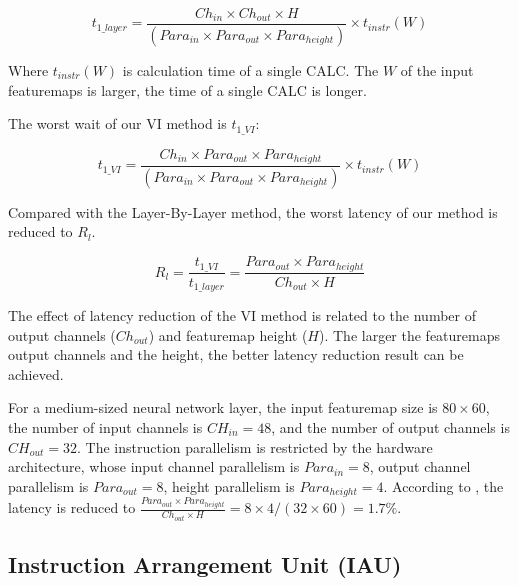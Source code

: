 \begin{equation*}
	t_{1\_layer} = \frac{ Ch_{in} \times Ch_{out} \times H }{ (Para_{in} \times Para_{out} \times Para_{height}) } \times t_{instr}(W)
\end{equation*}

Where $t_{instr}(W)$ is calculation time of a single CALC. The $W$ of the input featuremaps is larger, the time of a single CALC is longer.

The worst wait of our VI method is $t_{1\_VI}$:

\begin{equation*}
	t_{1\_VI} = \frac{ Ch_{in} \times Para_{out} \times Para_{height} }{ (Para_{in} \times Para_{out} \times Para_{height}) }  \times t_{instr}(W)
\end{equation*}

Compared with the Layer-By-Layer method, the worst latency of our method is reduced to $R_l$.

\begin{equation*}
	R_l = \frac{ t_{1\_VI} }{ t_{1\_layer} }  = \frac{ Para_{out} \times Para_{height} }{ Ch_{out} \times H} 
	\label{equ:rate}
\end{equation*}

The effect of latency reduction of the VI method is related to the number of output channels ($Ch_{out}$) and featuremap height ($H$). The larger the featuremaps output channels and the height, the better latency reduction result can be achieved.

For a medium-sized neural network layer, the input featuremap size is $80 \times 60$, the number of input channels is $CH_{in} = 48$, and the number of output channels is $CH_{out} = 32$. The instruction parallelism is restricted by the hardware architecture, whose input channel parallelism is $Para_{in} = 8$, output channel parallelism is $Para_{out} = 8$, height parallelism is $Para_{height} = 4$.
According to , the latency is reduced to $\frac{ Para_{out} \times Para_{height} }{ Ch_{out} \times H} = 8 \times 4 / (32 \times 60) = 1.7\%$.


\subsection{ Instruction Arrangement Unit (IAU) }

